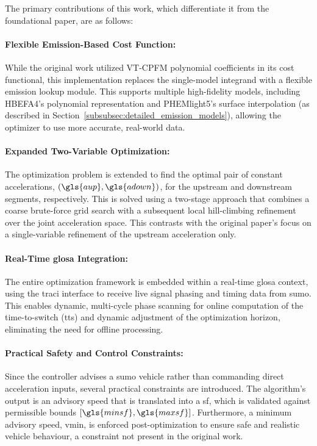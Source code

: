 The primary contributions of this work, which differentiate it from the foundational paper, are as follows:

\paragraph{Flexible Emission-Based Cost Function:} While the original work utilized VT-CPFM polynomial coefficients in its cost functional, this implementation replaces the single-model integrand with a flexible emission lookup module. This supports multiple high-fidelity models, including HBEFA4’s polynomial representation and PHEMlight5’s surface interpolation (as described in Section~\vref{subsubsec:detailed_emission_models}), allowing the optimizer to use more accurate, real-world data.

\paragraph{Expanded Two-Variable Optimization:} The optimization problem is extended to find the optimal pair of constant accelerations, $(\gls{aup}, \gls{adown})$, for the upstream and downstream segments, respectively. This is solved using a two-stage approach that combines a coarse brute-force grid search with a subsequent local hill-climbing refinement over the joint acceleration space. This contrasts with the original paper's focus on a single-variable refinement of the upstream acceleration only.

\paragraph{Real-Time \ac{glosa} Integration:} The entire optimization framework is embedded within a real-time \ac{glosa} context, using the \ac{traci} interface to receive live signal phasing and timing data from \ac{sumo}. This enables dynamic, multi-cycle phase scanning for online computation of the time-to-switch (\gls{tts}) and dynamic adjustment of the optimization horizon, eliminating the need for offline processing.

\paragraph{Practical Safety and Control Constraints:} Since the controller advises a \ac{sumo} vehicle rather than commanding direct acceleration inputs, several practical constraints are introduced. The algorithm's output is an advisory speed that is translated into a \gls{sf}, which is validated against permissible bounds $[\gls{minsf}, \gls{maxsf}]$. Furthermore, a minimum advisory speed, \gls{vmin}, is enforced post-optimization to ensure safe and realistic vehicle behaviour, a constraint not present in the original work.


